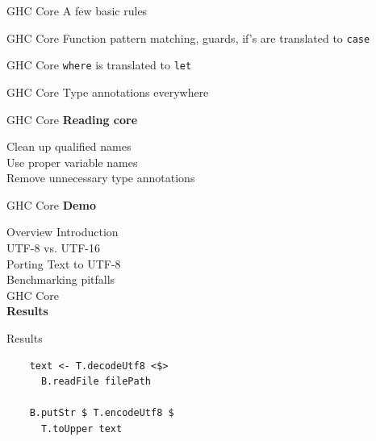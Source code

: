 \documentclass[20pt]{beamer}
\newcommand{\vspaced}{
    \vspace{5mm}
}
\begin{document}
\begin{frame}{GHC Core}
    A few basic rules
\end{frame}

\begin{frame}{GHC Core}
    Function pattern matching, guards, if's are translated to \texttt{case}
\end{frame}

\begin{frame}{GHC Core}
    \texttt{where} is translated to \texttt{let}
\end{frame}

\begin{frame}{GHC Core}
    Type annotations everywhere
\end{frame}

\begin{frame}{GHC Core}
    \textbf{Reading core} \\
    \vspaced
    Clean up qualified names \\
    Use proper variable names \\
    Remove unnecessary type annotations
\end{frame}

\begin{frame}{GHC Core}
    \textbf{Demo}
\end{frame}


\begin{frame}{Overview}
    Introduction \\
    UTF-8 vs. UTF-16 \\
    Porting Text to UTF-8 \\
    Benchmarking pitfalls \\
    GHC Core \\
    \textbf{Results}
\end{frame}

\begin{frame}[fragile]{Results}
    \begin{lstlisting}
    text <- T.decodeUtf8 <$>
      B.readFile filePath

    B.putStr $ T.encodeUtf8 $
      T.toUpper text
    \end{lstlisting}
\end{frame}
\end{document}

